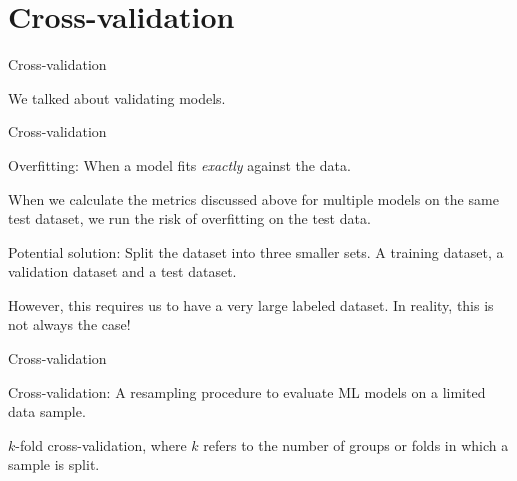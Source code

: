 \documentclass[handout]{beamer}
\begin{document}
\section{Cross-validation}

\begin{frame}{Cross-validation}

We talked about validating models.

\end{frame}



\begin{frame}{Cross-validation}
	
	Overfitting: When a model fits \emph{exactly} against the data.
	
	When we calculate the metrics discussed above for multiple models on the same test dataset, we run the risk of overfitting on the test data.
	
	Potential solution: Split the dataset into three smaller sets. A training dataset, a validation dataset and a test dataset.
	
	However, this requires us to have a very large labeled dataset. In reality, this is not always the case!
	
	
	
\end{frame}


\begin{frame}{Cross-validation}
	
	Cross-validation: A resampling procedure to evaluate ML models on a limited data sample.
	
	\(k\)-fold cross-validation, where \(k\) refers to the number of groups or folds in which a sample is split.

\end{frame}
\end{document}
